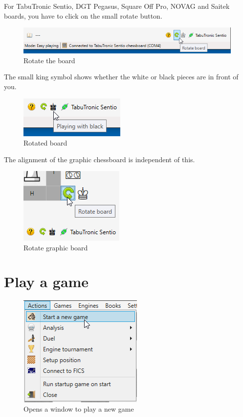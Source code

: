 \documentclass[11pt,a4paper]{article}
\begin{document}
For TabuTronic Sentio, DGT Pegasus, Square Off Pro, NOVAG and Saitek boards, you have
to click on the small rotate button.

\begin{figure}[H]
	\centering
	\includegraphics[scale=0.75]{rotate1.png}
	\caption{Rotate the board}
	\label{fig:Rotate1}
\end{figure}

The small king symbol shows whether the white or black pieces are in front of you.

\begin{figure}[H]
	\centering
	\includegraphics[scale=1.0]{rotate2.png}
	\caption{Rotated board}
	\label{fig:Rotate2}
\end{figure}

The alignment of the graphic chessboard is independent of this.

\begin{figure}[H]
	\centering
	\includegraphics[scale=1.0]{rotate3.png}
	\caption{Rotate graphic board}
	\label{fig:Rotate3}
\end{figure}

\section{Play a game}

\begin{figure}[H]
	\centering
	\includegraphics[scale=1.0]{NewGame1.png}
	\caption{Opens a window to play a new game}
	\label{fig:NewGame1}
\end{figure}
\end{document}
